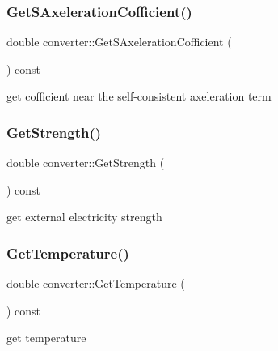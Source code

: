 \subsubsection{\texorpdfstring{Get\+S\+Axeleration\+Cofficient()}{GetSAxelerationCofficient()}}
{\footnotesize\ttfamily double converter\+::\+Get\+S\+Axeleration\+Cofficient (\begin{DoxyParamCaption}{ }\end{DoxyParamCaption}) const}



get cofficient near the self-\/consistent axeleration term 

\mbox{\label{classconverter_af57bd275b4cf7495a5bdf23e47bbcd15}} 
\subsubsection{\texorpdfstring{Get\+Strength()}{GetStrength()}}
{\footnotesize\ttfamily double converter\+::\+Get\+Strength (\begin{DoxyParamCaption}{ }\end{DoxyParamCaption}) const}



get external electricity strength 

\mbox{\label{classconverter_ab4f324a1ff9ac52d10a6b11ad588e6df}} 
\subsubsection{\texorpdfstring{Get\+Temperature()}{GetTemperature()}}
{\footnotesize\ttfamily double converter\+::\+Get\+Temperature (\begin{DoxyParamCaption}{ }\end{DoxyParamCaption}) const}



get temperature 

\mbox{\label{classconverter_a638841356fabc1a3f3b2d1d4d4daed01}} 
